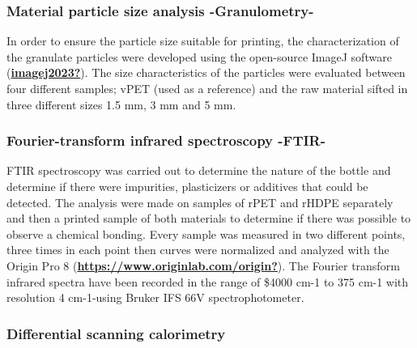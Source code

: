 \documentclass[
  12pt,
  number,
  review]{elsarticle}
\begin{document}
\hypertarget{material-particle-size-analysis--granulometry-}{%
\subsubsection{Material particle size analysis
-Granulometry-}\label{material-particle-size-analysis--granulometry-}}

In order to ensure the particle size suitable for printing, the
characterization of the granulate particles were developed using the
open-source ImageJ software
(\protect\hyperlink{ref-imagej2023}{\textbf{imagej2023?}}). The size
characteristics of the particles were evaluated between four different
samples; vPET (used as a reference) and the raw material sifted in three
different sizes 1.5 mm, 3 mm and 5 mm.

\hypertarget{fourier-transform-infrared-spectroscopy--ftir-}{%
\subsubsection{Fourier-transform infrared spectroscopy
-FTIR-}\label{fourier-transform-infrared-spectroscopy--ftir-}}

FTIR spectroscopy was carried out to determine the nature of the bottle
and determine if there were impurities, plasticizers or additives that
could be detected. The analysis were made on samples of rPET and rHDPE
separately and then a printed sample of both materials to determine if
there was possible to observe a chemical bonding. Every sample was
measured in two different points, three times in each point then curves
were normalized and analyzed with the Origin Pro 8
(\protect\hyperlink{ref-https:ux2fux2fwww.originlab.comux2forigin}{\textbf{https://www.originlab.com/origin?}}).
The Fourier transform infrared spectra have been recorded in the range
of \$4000 cm-1 to 375 cm-1 with resolution 4 cm-1-using Bruker IFS 66V
spectrophotometer.

\hypertarget{differential-scanning-calorimetry}{%
\subsubsection{Differential scanning
calorimetry}\label{differential-scanning-calorimetry}}
\end{document}
